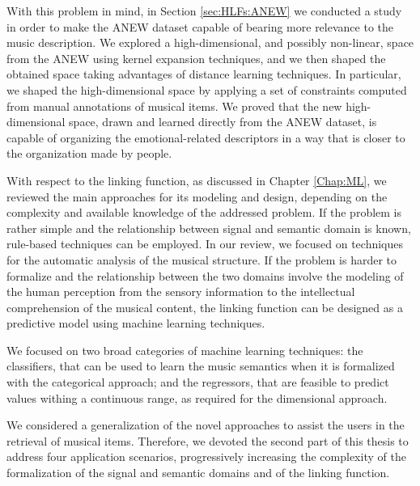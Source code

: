 With this problem in mind, in Section \ref{sec:HLFs:ANEW} we conducted a study in order to make the ANEW dataset capable of bearing more relevance to the music description. We explored a high-dimensional, and possibly non-linear, space from the ANEW using kernel expansion techniques, and we then shaped the obtained space taking advantages of distance learning techniques. In particular, we shaped the high-dimensional space by applying a set of constraints computed from manual annotations of musical items. We proved that the new high-dimensional space, drawn and learned directly from the ANEW dataset, is capable of organizing the emotional-related descriptors in a way that is closer to the organization made by people. 

With respect to the linking function, as discussed in Chapter \ref{Chap:ML}, we reviewed the main approaches for its modeling and design, depending on the complexity and available knowledge of the addressed problem. If the problem is rather simple and the relationship between signal and semantic domain is known, rule-based techniques can be employed. In our review, we focused on techniques for the automatic analysis of the musical structure. If the problem is harder to formalize and the relationship between the two domains involve the modeling of the human perception from the sensory information to the intellectual comprehension of the musical content, the linking function can be designed as a predictive model using machine learning techniques.

We focused on two broad categories of machine learning techniques: the classifiers, that can be used to learn the music semantics when it is formalized with the categorical approach; and the regressors, that are feasible to predict values withing a continuous range, as required for the dimensional approach. 

We considered a generalization of the novel approaches to assist the users in the retrieval of musical items. Therefore, we devoted the second part of this thesis to address four application scenarios, progressively increasing the complexity of the formalization of the signal and semantic domains and of the linking function.

